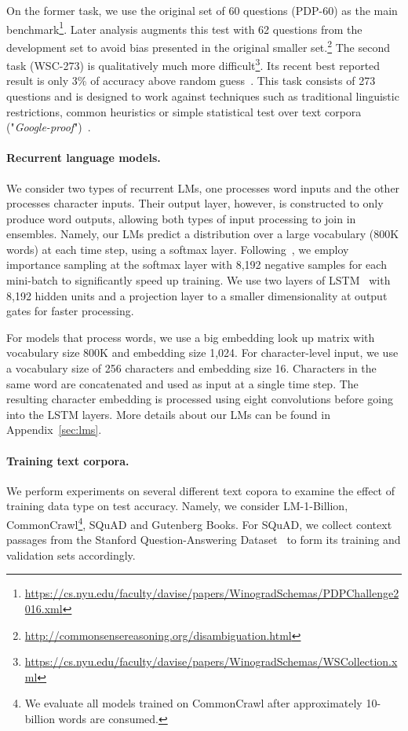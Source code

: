 \documentclass{article}
\begin{document}
On the former task, we use the original set of 60 questions (PDP-60) as the main benchmark\footnote{\url{https://cs.nyu.edu/faculty/davise/papers/WinogradSchemas/PDPChallenge2016.xml}}. Later analysis augments this test with 62 questions from the development set to avoid bias presented in the original smaller set.\footnote{\url{http://commonsensereasoning.org/disambiguation.html}} The second task (WSC-273) is qualitatively much more difficult\footnote{\url{https://cs.nyu.edu/faculty/davise/papers/WinogradSchemas/WSCollection.xml}}. Its recent best reported result is only 3\% of accuracy above random guess~\cite{quanliu16winograd}. This task consists of 273 questions and is designed to work against techniques such as traditional linguistic restrictions, common heuristics or simple statistical test over text corpora ("\textit{Google-proof}")~\cite{levesque2011winograd}.

\paragraph{Recurrent language models.} We consider two types of recurrent LMs, one processes word inputs and the other processes character inputs. Their output layer, however, is constructed to only produce word outputs, allowing both types of input processing to join in ensembles. Namely, our LMs predict a distribution over a large vocabulary (800K words) at each time step, using a softmax layer. Following~\cite{rafal16lm}, we employ importance sampling at the softmax layer with 8,192 negative samples for each mini-batch to significantly speed up training. We use two layers of LSTM~\cite{hochreiter1997long} with 8,192 hidden units and a projection layer to a smaller dimensionality at output gates for faster processing.

For models that process words, we use a big embedding look up matrix with vocabulary size 800K and embedding size 1,024. For character-level input, we use a vocabulary size of 256 characters and embedding size 16. Characters in the same word are concatenated and used as input at a single time step. The resulting character embedding is processed using eight convolutions before going into the LSTM layers. More details about our LMs can be found in Appendix~\ref{sec:lms}.






\paragraph{Training text corpora.} We perform experiments on several different text copora to examine the effect of training data type on test accuracy. Namely, we consider LM-1-Billion, CommonCrawl\footnote{We evaluate all models trained on CommonCrawl after approximately 10-billion words are consumed.}, SQuAD and Gutenberg Books. For SQuAD, we collect context passages from the Stanford Question-Answering Dataset~\cite{rajpurkar2016squad} to form its training and validation sets accordingly. 
\end{document}
